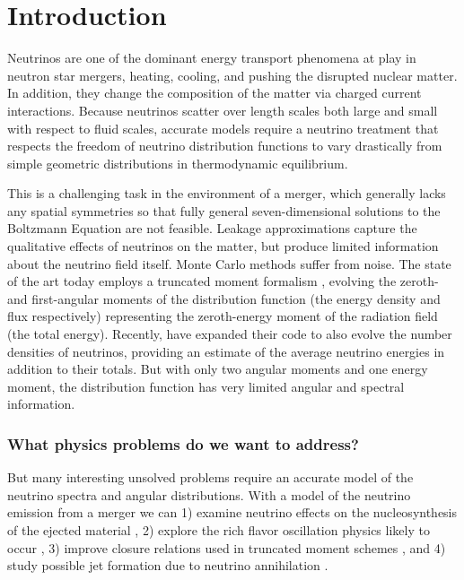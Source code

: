 \documentclass[aps,floatfix,prd,superscriptaddress,twocolumn]{revtex4-1}
\newcommand{\todo}[1]{\marginpar{\tiny{\textcolor{red}{#1}}}}
\begin{document}
\maketitle

\section{Introduction}
Neutrinos are one of the dominant energy transport phenomena at play in
neutron star mergers, heating, cooling, and pushing the disrupted nuclear
matter.
In addition, they change the composition of the matter via charged current
interactions.
Because neutrinos scatter over length scales both large and small with
respect to fluid scales, accurate models require a neutrino treatment that
respects the freedom of neutrino distribution functions to vary
drastically from simple geometric distributions in thermodynamic equilibrium.

This is a challenging task in the environment of a merger,
which generally lacks any spatial symmetries so that fully general
seven-dimensional solutions to the Boltzmann Equation are not feasible.
Leakage approximations
\citep{deat2013-leakage, pere2016-asl, radi2016-dynamical, ?}
capture the qualitative effects of neutrinos on the matter, but
produce limited information about the neutrino field itself.
Monte Carlo methods \citep{abdi2012-monte_carlo, rich2015-monte_carlo}
suffer from noise.
\todo{discuss mc more clearly}
The state of the art today employs a truncated moment formalism
\citep{shib2011-truncated_moment, fouc2015-m1_nsbh, fouc2016-m1_nsns,
  just2015-m1_code, ?},
evolving the zeroth- and first-angular moments of the distribution function
(the energy density and flux respectively) representing the zeroth-energy moment
of the radiation field (the total energy).
Recently, \cite{fouc2016-m1_evolve_n} have expanded their code to also evolve
the number densities of neutrinos, providing an estimate of the average neutrino
energies in addition to their totals.
But with only two angular moments and one energy moment, the distribution
function has very limited angular and spectral information.

\subsubsection*{What physics problems do we want to address?}
But many interesting unsolved problems require an accurate model of the neutrino
spectra and angular distributions.
With a model of the neutrino emission from a merger we can
1) examine neutrino effects on the nucleosynthesis of the ejected material
\citep{surm2011-nickel_56, robe2016-sph_nu_nucleo},
2) explore the rich flavor oscillation physics likely to occur
\citep{malk2012-mnr_1, malk2015-mnr_2, malk2016-mnr_3, zhu2016-mnr_nsns_remnant,
  vaan2016-uncovering_mnr},
3) improve closure relations used in truncated moment schemes
\citep{ramp2002-truncated_moment, shib2011-truncated_moment,
  card2013-truncated_moment, fouc2015-m1_nsbh, ocon2015-gr1d_with_nu}, and
4) study possible jet formation due to neutrino annihilation
\citep{ruff1999-nunubar_nsns, asan2000-nunubar, birk2007-nunubar,
  hari2010-gr_nunubar_collapsar, zala2011-nunubar, leng2014-nunubar}.
\end{document}
